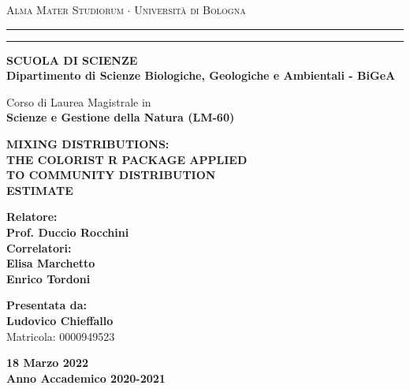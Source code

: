 \documentclass[12pt,a4paper]{article}
\begin{document}

\begin{titlepage}
\begin{center}
{{\Large{\textsc{Alma Mater Studiorum $\cdot$ Universit\`a di
Bologna}}}} \rule[0.1cm]{15.8cm}{0.1mm}
\rule[0.5cm]{15.8cm}{0.6mm}
{\small{\bf SCUOLA DI SCIENZE\\
Dipartimento di Scienze Biologiche, Geologiche e Ambientali - BiGeA }}
\end{center}
\vspace{6mm}
\begin{center}
    {Corso di Laurea Magistrale in\\
    \bf Scienze e Gestione della Natura (LM-60)}
\end{center}
\vspace{15mm}
\begin{center}
{\LARGE{\bf MIXING DISTRIBUTIONS:}}\\  
\vspace{3mm}
{\LARGE{\bf THE COLORIST R PACKAGE APPLIED }}\\
\vspace{3mm}
{\LARGE{\bf TO COMMUNITY DISTRIBUTION }}\\
\vspace{3mm}
{\LARGE{\bf ESTIMATE}}\\
\end{center}
\vspace{30mm}
\par
\noindent
\begin{minipage}[t]{0.47\textwidth}
{\large{\bf Relatore:\\

Prof. Duccio Rocchini}}\\

{\large{\bf Correlatori:\\

Elisa Marchetto\\ Enrico Tordoni}}
\end{minipage}
\hfill
\begin{minipage}[t]{0.47\textwidth}\raggedleft
{\large{\bf Presentata da:\\
Ludovico Chieffallo\\}
\vspace{3mm}
Matricola: 0000949523}
\end{minipage}
\vspace{20mm}
\begin{center}
{\large{\bf 18 Marzo 2022\\

Anno Accademico 2020-2021 }}
\end{center}
\end{titlepage}
\end{document}
